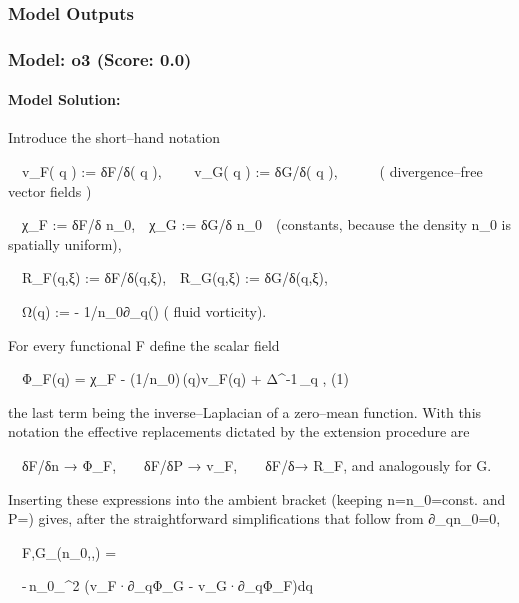 \documentclass[10pt]{article}
\begin{document}
\subsubsection*{Model Outputs}
\subsubsection*{Model: o3 (Score: 0.0)}
\paragraph*{Model Solution:}
Introduce the short–hand notation  

 v_F( q )  :=  δF/δ\bm{\pi}( q ), 
 v_G( q )  :=  δG/δ\bm{\pi}( q ),   ( divergence–free vector fields )

 χ_F       :=  δF/δ n_{0}, χ_G := δG/δ n_{0} (constants, because the density
                                                 n_{0} is spatially uniform),

 R_F(q,ξ)  :=  δF/δ\varrho(q,ξ), R_G(q,ξ) := δG/δ\varrho(q,ξ),

 Ω(q)      := - 1/n_{0}\;∂_{q}\!\cdot\!\bigl(\bm{\pi}\bigr)  
                                                             ( fluid vorticity).

For every functional F define the scalar field

 Φ_F(q) = χ_F - (1/n_{0})\,\bm{\pi}(q)\!\cdot\!v_F(q)
          + Δ^{-1}\,\partial_{q}\!\cdot\!
            ,                              (1)

the last term being the inverse–Laplacian of a zero–mean function.
With this notation the effective replacements dictated by the
extension procedure are

 δF/δn  →  Φ_F,  δF/δ\bm P → v_F,  δF/δ\varrho → R_F,         and analogously for G.

Inserting these expressions into the ambient bracket (keeping
n=n_{0}=const. and \bm P=\bm{\pi}) gives, after the straightforward
simplifications that follow from ∂_{q}n_{0}=0,

 {F,G}_{\Sigma}(n_{0},\bm{\pi},\varrho)  =

 -\,\varepsilon n_{0}\!\int_{^{2}}
             \bigl(v_F·∂_{q}Φ_G - v_G·∂_{q}Φ_F\bigr)\;d\bm q
\end{document}
